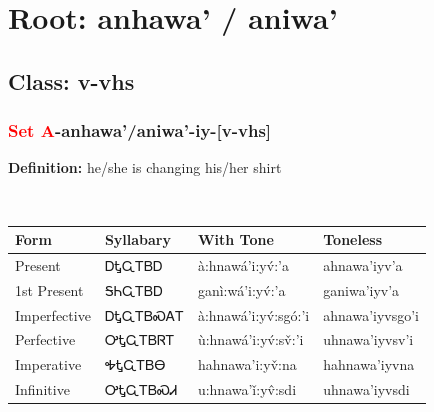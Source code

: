 \needspace{4in}
\section*{Root: anhawa' / aniwa'}
\nopagebreak
{}
\needspace{3in}
\subsection*{Class: v-vhs}
\nopagebreak
\needspace{2in}
\subsubsection*{\textcolor{Red}{Set A}{-}\textbf{anhawa'/aniwa'}{-}iy{-}[v-vhs]}
\nopagebreak
\textbf{Definition: } he/she is changing his/her shirt
\\[0.5em]
\begin{tabularx}{\textwidth}{l X X X}%
\toprule%
\textbf{Form}&\textbf{Syllabary}&\textbf{With Tone}&\textbf{Toneless}\\%
\midrule%
Present&ᎠᎿᏩᎢᏴᎠ&à:hnawá’i:yv́:’a&ahnawa’iyv’a\\%
1st Present&ᎦᏂᏩᎢᏴᎠ&ganì:wá’i:yv́:’a&ganiwa’iyv’a\\%
Imperfective&ᎠᎿᏩᎢᏴᏍᎪᎢ&à:hnawá’i:yv́:sgó:’i&ahnawa’iyvsgo’i\\%
Perfective&ᎤᎿᏩᎢᏴᏒᎢ&ù:hnawá’i:yv́:sv̌:’i&uhnawa’iyvsv’i\\%
Imperative&ᎭᎿᏩᎢᏴᎾ&hahnawa’i:yv̌:na&hahnawa’iyvna\\%
Infinitive&ᎤᎿᏩᎢᏴᏍᏗ&u:hnawa’ǐ:yv̂:sdi&uhnawa’iyvsdi\\%
\bottomrule%
\end{tabularx}
\\[1em]